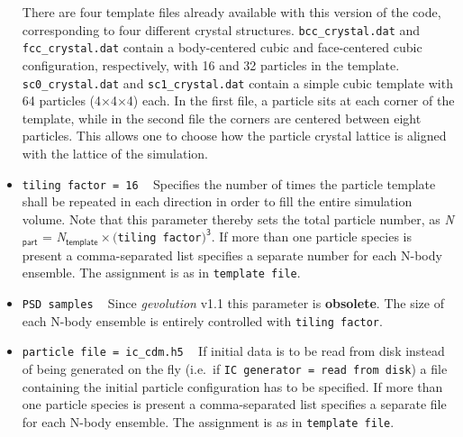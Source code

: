 \documentclass[a4paper,10pt]{article}
\begin{document}
\begin{itemize}
 There are four template files already available with this version of the code, corresponding to four different crystal structures.
 \texttt{bcc\_crystal.dat} and \texttt{fcc\_crystal.dat} contain a body-centered cubic and face-centered cubic configuration, respectively,
 with 16 and 32 particles in the template. \texttt{sc0\_crystal.dat} and \texttt{sc1\_crystal.dat} contain a simple cubic template with 64
 particles (4$\times$4$\times$4) each. In the first file, a particle sits at each corner of the template, while in the second file the
 corners are centered between eight particles. This allows one to choose how the particle crystal lattice is aligned with the lattice of the
 simulation.
 \item[] \hspace{-25pt}\texttt{tiling factor = 16} ~ Specifies the number of times the particle template shall be repeated in each direction
 in order to fill the entire simulation volume. Note that this parameter thereby sets the total particle number, as
 \textit{N}$_\mathsf{part}$ = \textit{N}$_\mathsf{template} \times ($\texttt{tiling factor}$)^\mathsf{3}$. If more than one particle species
 is present a comma-separated list specifies a separate number for each N-body ensemble. The assignment is as in \texttt{template file}.
 \item[] \hspace{-25pt}\texttt{PSD samples} ~ Since \textit{gevolution} v1.1 this parameter is \textbf{obsolete}. The size of each N-body
 ensemble is entirely controlled with \texttt{tiling factor}.
 \item[] \hspace{-25pt}\texttt{particle file = ic\_cdm.h5} ~ If initial data is to be read from disk instead of being generated on the fly (i.e.\ if \texttt{IC~generator~=~read~from~disk}) a file containing the initial particle configuration has to be specified. If more than
 one particle species is present a comma-separated list specifies a separate file for each N-body ensemble. The assignment is as in \texttt{template file}.
 

\end{itemize}
\end{document}
